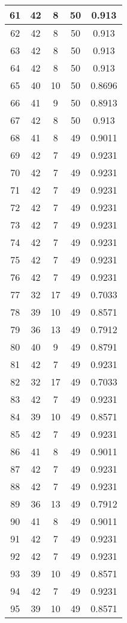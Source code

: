\documentclass[letterpaper, 12pt]{article}
\begin{document}
\begin{longtable}{|c|c|c|c|c|}
61 & 42 & 8 & 50 & 0.913 \\
\hline
62 & 42 & 8 & 50 & 0.913 \\
\hline
63 & 42 & 8 & 50 & 0.913 \\
\hline
64 & 42 & 8 & 50 & 0.913 \\
\hline
65 & 40 & 10 & 50 & 0.8696 \\
\hline
66 & 41 & 9 & 50 & 0.8913 \\
\hline
67 & 42 & 8 & 50 & 0.913 \\
\hline
68 & 41 & 8 & 49 & 0.9011 \\
\hline
69 & 42 & 7 & 49 & 0.9231 \\
\hline
70 & 42 & 7 & 49 & 0.9231 \\
\hline
71 & 42 & 7 & 49 & 0.9231 \\
\hline
72 & 42 & 7 & 49 & 0.9231 \\
\hline
73 & 42 & 7 & 49 & 0.9231 \\
\hline
74 & 42 & 7 & 49 & 0.9231 \\
\hline
75 & 42 & 7 & 49 & 0.9231 \\
\hline
76 & 42 & 7 & 49 & 0.9231 \\
\hline
77 & 32 & 17 & 49 & 0.7033 \\
\hline
78 & 39 & 10 & 49 & 0.8571 \\
\hline
79 & 36 & 13 & 49 & 0.7912 \\
\hline
80 & 40 & 9 & 49 & 0.8791 \\
\hline
81 & 42 & 7 & 49 & 0.9231 \\
\hline
82 & 32 & 17 & 49 & 0.7033 \\
\hline
83 & 42 & 7 & 49 & 0.9231 \\
\hline
84 & 39 & 10 & 49 & 0.8571 \\
\hline
85 & 42 & 7 & 49 & 0.9231 \\
\hline
86 & 41 & 8 & 49 & 0.9011 \\
\hline
87 & 42 & 7 & 49 & 0.9231 \\
\hline
88 & 42 & 7 & 49 & 0.9231 \\
\hline
89 & 36 & 13 & 49 & 0.7912 \\
\hline
90 & 41 & 8 & 49 & 0.9011 \\
\hline
91 & 42 & 7 & 49 & 0.9231 \\
\hline
92 & 42 & 7 & 49 & 0.9231 \\
\hline
93 & 39 & 10 & 49 & 0.8571 \\
\hline
94 & 42 & 7 & 49 & 0.9231 \\
\hline
95 & 39 & 10 & 49 & 0.8571 \\

\end{longtable}
\end{document}
